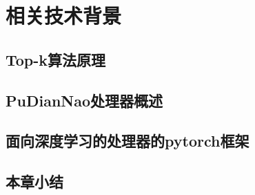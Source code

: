 \chapter{相关技术背景}
\section{Top-k算法原理}
\section{PuDianNao处理器概述}
\section{面向深度学习的处理器的pytorch框架}

\section{本章小结}
